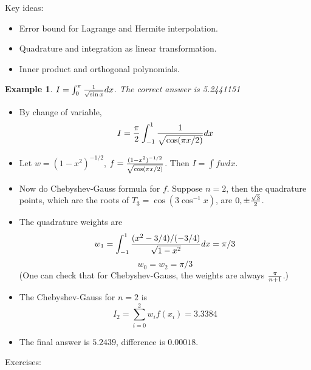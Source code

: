 \documentclass[20pt]{article} %
\theoremstyle{break}
\newtheorem{exa}[definition]{Example}
\begin{document}
Key ideas:

\begin{itemize}
\item Error bound for Lagrange and Hermite interpolation.
\item Quadrature and integration as linear transformation.
\item Inner product and orthogonal polynomials.
\end{itemize}

\newpage

\begin{exa}$I=\int_0^\pi{1\over \sqrt{\sin x}}dx$. The correct answer is 5.2441151\end{exa}

\begin{itemize}
\item By change of variable,
  \[I={\pi\over 2}\int_{-1}^1{1\over\sqrt{\cos (\pi x/2)}}dx\]
\item Let $w=(1-x^2)^{-1/2}$, $f={(1-x^2)^{-1/2}\over\sqrt{\cos (\pi x/2)}}$. Then $I=\int fwdx$.
\item Now do Chebyshev-Gauss formula for $f$. Suppose $n=2$, then the quadrature points, which are the roots of $T_3=\cos(3\cos^{-1}x)$, are $0, \pm{\sqrt{3}\over 2}$.
\item The quadrature weights are
  \[w_1=\int_{-1}^1{(x^2-3/4)/(-3/4)\over\sqrt{1-x^2}}dx=\pi/3\]
  \[w_0=w_2=\pi/3\]
  (One can check that for Chebyshev-Gauss, the weights are always $\pi\over n+1$.)
\item The Chebyshev-Gauss for $n=2$ is
  \[I_2=\sum_{i=0}^2w_if(x_i)=3.3384\]
\item The final answer is $5.2439$, difference is $0.00018$.
\end{itemize}

\newpage

Exercises:
\end{document}
